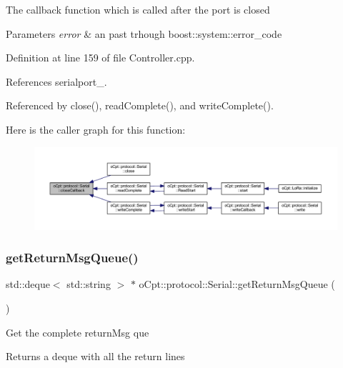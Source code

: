 The callback function which is called after the port is closed 
\begin{DoxyParams}{Parameters}
{\em error} & an past trhough boost\+::system\+::error\+\_\+code \\
\hline
\end{DoxyParams}


Definition at line 159 of file Controller.\+cpp.



References serialport\+\_\+.



Referenced by close(), read\+Complete(), and write\+Complete().

Here is the caller graph for this function\+:\nopagebreak
\begin{figure}[H]
\begin{center}
\leavevmode
\includegraphics[width=350pt]{classo_cpt_1_1protocol_1_1_serial_a3abae181678a125e420092465d063526_icgraph}
\end{center}
\end{figure}
\hypertarget{classo_cpt_1_1protocol_1_1_serial_ad1c50382b0f52828b3111f4dc2f03bad}{}\label{classo_cpt_1_1protocol_1_1_serial_ad1c50382b0f52828b3111f4dc2f03bad} 
\subsubsection{\texorpdfstring{get\+Return\+Msg\+Queue()}{getReturnMsgQueue()}}
{\footnotesize\ttfamily std\+::deque$<$ std\+::string $>$ $\ast$ o\+Cpt\+::protocol\+::\+Serial\+::get\+Return\+Msg\+Queue (\begin{DoxyParamCaption}{ }\end{DoxyParamCaption})}

Get the complete return\+Msg que \begin{DoxyReturn}{Returns}
a deque with all the return lines 
\end{DoxyReturn}


